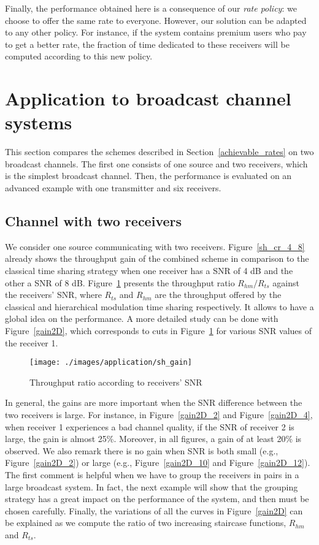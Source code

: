 \documentclass[conference, letterpaper]{IEEEtran}
\begin{document}
Finally, the performance obtained here is a consequence of our \emph{rate policy}: we choose to offer the same rate to everyone. However, our solution can be adapted to any other policy. For instance, if the system contains premium users who pay to get a better rate, the fraction of time dedicated to these receivers will be computed according to this new policy.



 \section{Application to broadcast channel systems}\label{application}

This section compares the schemes described in Section~\ref{achievable_rates} on two broadcast channels. The first one consists of one source and two receivers, which is the simplest broadcast channel. Then, the performance is evaluated on an advanced example with one transmitter and six receivers.


\subsection{Channel with two receivers}

We consider one source communicating with two receivers. Figure~\ref{sh_cr_4_8} already shows the throughput gain of the combined scheme in comparison to the classical time sharing strategy when one receiver has a SNR of 4 dB and the other a SNR of 8 dB. Figure~\ref{sh_gain} presents the throughput ratio $R_{hm}/R_{ts}$ against the receivers' SNR, where $R_{ts}$ and $R_{hm}$ are the throughput offered by the classical and hierarchical modulation time sharing respectively. It allows to have a global idea on the performance. A more detailed study can be done with Figure~\ref{gain2D}, which corresponds to cuts in Figure~\ref{sh_gain} for various SNR values of the receiver 1.

\begin{figure}[!ht]
\centering
\texttt{[image: ./images/application/sh\_gain]}
\caption{Throughput ratio according to receivers' SNR}
\label{sh_gain}
\end{figure}

In general, the gains are more important when the SNR difference between the two receivers is large. For instance, in Figure~\ref{gain2D_2} and Figure~\ref{gain2D_4}, when receiver 1 experiences a bad channel quality, if the SNR of receiver 2 is large, the gain is almost 25\%. Moreover, in all figures, a gain of at least 20\% is observed. We also remark there is no gain when SNR is both small (e.g., Figure~\ref{gain2D_2}) or large (e.g., Figure~\ref{gain2D_10} and Figure~\ref{gain2D_12}). The first comment is helpful when we have to group the receivers in pairs in a large broadcast system. In fact, the next example will show that the grouping strategy has a great impact on the performance of the system, and then must be chosen carefully. Finally, the variations of all the curves in Figure~\ref{gain2D} can be explained as we compute the ratio of two increasing staircase functions, $R_{hm}$ and $R_{ts}$.
\end{document}

